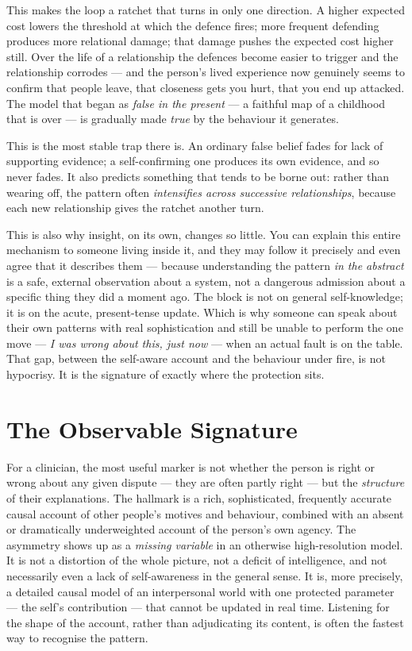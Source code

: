 \documentclass{article}
\begin{document}
This makes the loop a ratchet that turns in only one direction. A higher expected cost lowers the threshold at which the defence fires; more frequent defending produces more relational damage; that damage pushes the expected cost higher still. Over the life of a relationship the defences become easier to trigger and the relationship corrodes --- and the person's lived experience now genuinely seems to confirm that people leave, that closeness gets you hurt, that you end up attacked. The model that began as \textit{false in the present} --- a faithful map of a childhood that is over --- is gradually made \textit{true} by the behaviour it generates.

This is the most stable trap there is. An ordinary false belief fades for lack of supporting evidence; a self-confirming one produces its own evidence, and so never fades. It also predicts something that tends to be borne out: rather than wearing off, the pattern often \textit{intensifies across successive relationships}, because each new relationship gives the ratchet another turn.

This is also why insight, on its own, changes so little. You can explain this entire mechanism to someone living inside it, and they may follow it precisely and even agree that it describes them --- because understanding the pattern \textit{in the abstract} is a safe, external observation about a system, not a dangerous admission about a specific thing they did a moment ago. The block is not on general self-knowledge; it is on the acute, present-tense update. Which is why someone can speak about their own patterns with real sophistication and still be unable to perform the one move --- \textit{I was wrong about this, just now} --- when an actual fault is on the table. That gap, between the self-aware account and the behaviour under fire, is not hypocrisy. It is the signature of exactly where the protection sits.

\section*{The Observable Signature}

For a clinician, the most useful marker is not whether the person is right or wrong about any given dispute --- they are often partly right --- but the \textit{structure} of their explanations. The hallmark is a rich, sophisticated, frequently accurate causal account of other people's motives and behaviour, combined with an absent or dramatically underweighted account of the person's own agency. The asymmetry shows up as a \textit{missing variable} in an otherwise high-resolution model. It is not a distortion of the whole picture, not a deficit of intelligence, and not necessarily even a lack of self-awareness in the general sense. It is, more precisely, a detailed causal model of an interpersonal world with one protected parameter --- the self's contribution --- that cannot be updated in real time. Listening for the shape of the account, rather than adjudicating its content, is often the fastest way to recognise the pattern.
\end{document}
